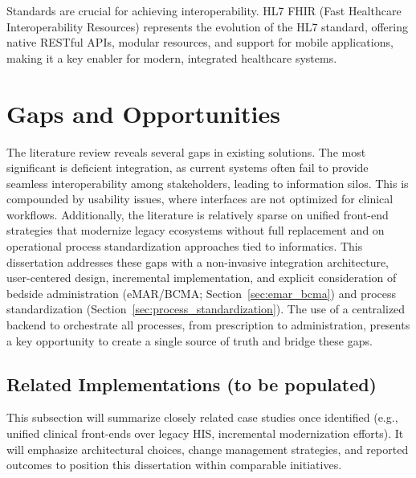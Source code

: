 Standards are crucial for achieving interoperability. HL7 FHIR (Fast Healthcare Interoperability Resources) represents the evolution of the HL7 standard, offering native RESTful APIs, modular resources, and support for mobile applications, making it a key enabler for modern, integrated healthcare systems.

\section{Gaps and Opportunities}

The literature review reveals several gaps in existing solutions. The most significant is deficient integration, as current systems often fail to provide seamless interoperability among stakeholders, leading to information silos. This is compounded by usability issues, where interfaces are not optimized for clinical workflows. Additionally, the literature is relatively sparse on unified front-end strategies that modernize legacy ecosystems without full replacement and on operational process standardization approaches tied to informatics. This dissertation addresses these gaps with a non-invasive integration architecture, user-centered design, incremental implementation, and explicit consideration of bedside administration (eMAR/BCMA; Section~\ref{sec:emar_bcma}) and process standardization (Section~\ref{sec:process_standardization}). The use of a centralized backend to orchestrate all processes, from prescription to administration, presents a key opportunity to create a single source of truth and bridge these gaps.

\subsection{Related Implementations (to be populated)}
This subsection will summarize closely related case studies once identified (e.g., unified clinical front-ends over legacy HIS, incremental modernization efforts). It will emphasize architectural choices, change management strategies, and reported outcomes to position this dissertation within comparable initiatives.

